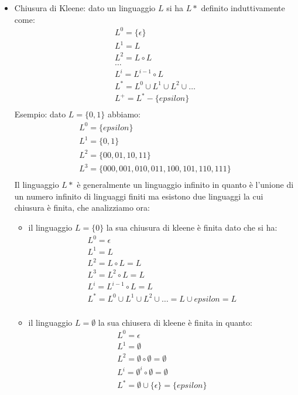 \documentclass[a4paper]{book}
\theoremstyle{definition}%
\begin{document}
\begin{itemize}
  \item Chiusura di Kleene: dato un linguaggio $L$ si ha $L*$ definito induttivamente come:
    \begin{equation*}
    \begin{split}
      L^0 = \{\epsilon\} \\
      L^1 = L \\
      L^2 = L \circ L \\
      \dots \\
      L^i = L^{i-1} \circ L\\
      L^* = L^0 \cup L^1 \cup L^2 \cup \dots \\
      L^+ = L^* - \{epsilon\} \\
    \end{split}
    \end{equation*}
    Esempio: dato $L = \{0,1\}$ abbiamo:
    \[
    \begin{split}
      L^0 = \{epsilon\}\\
      L^1 = \{0, 1\}\\
      L^2 = \{00, 01, 10, 11\}\\
      L^3 = \{000, 001, 010, 011, 100, 101, 110, 111\} \\
    \end{split}
    \]
    Il linguaggio $L*$ è generalmente un linguaggio infinito in quanto è l'unione di un numero infinito di linguaggi finiti
    ma esistono due linguaggi la cui chiusura è finita, che analizziamo ora:
    \begin{itemize}
    \item il linguaggio $L = \{0\}$ la sua chiusura di kleene è finita dato che si ha:
      \[
      \begin{split}
        L^0 = \epsilon \\
        L^1 = L\\
        L^2 = L \circ L = L\\
        L^3 = L^2 \circ L = L\\
        L^i = L^{i-1} \circ L = L \\
        L^* = L^0 \cup L^1 \cup L^2 \cup \dots = L \cup {epsilon} = L\\
      \end{split}
      \]

    \item il linguaggio $L = \emptyset$ la sua chiusera di kleene è finita in quanto:
      \[
      \begin{split}
      L^0 = \epsilon \\
      L^1 = \emptyset \\
      L^2 = \emptyset \circ \emptyset = \emptyset \\
      L^i = \emptyset^i \circ \emptyset = \emptyset \\
      L^* = \emptyset \cup \{\epsilon\} = \{epsilon\} \\
      \end{split}
      \]
    \end{itemize}%
  \end{itemize}%
\end{document}

